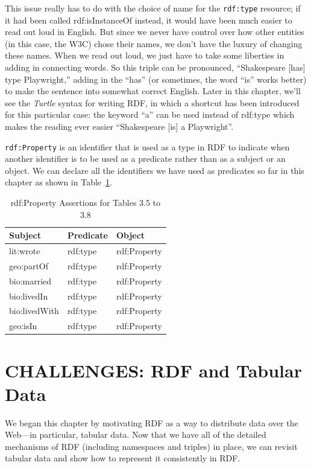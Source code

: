 This issue really has to do with the choice of name for the \texttt{rdf:type}
resource; if it had been called rdf:isInstanceOf instead, it would have
been much easier to read out loud in English. But since we never have
control over how other entities (in this case, the W3C) chose their
names, we don't have the luxury of changing these names. When we read
out loud, we just have to take some liberties in adding in connecting
words. So this triple can be pronounced, ``Shakespeare {[}has{]} type
Playwright,'' adding in the ``has'' (or sometimes, the word ``is'' works
better) to make the sentence into somewhat correct English. Later in
this chapter, we'll see the \emph{Turtle} syntax for writing RDF, in which a
shortcut has been introduced for this particular case: the keyword ``a''
can be used instead of rdf:type which makes the reading ever easier
``Shakespeare {[}is{]} a Playwright''.

\texttt{rdf:Property} is an identifier that is used as a type in RDF to indicate
when another identifier is to be used as a predicate rather than as a
subject or an object. We can declare all the identifiers we have used as
predicates so far in this chapter as shown in Table~\ref{tab:ch3.11}.

\begin{table}[h]
\centering
\begin{tabular}{||l l l ||} 
 \hline
 Subject&Predicate&Object \\ [0.5ex] 
 \hline\hline
lit:wrote&rdf:type&rdf:Property\\
geo:partOf&rdf:type&rdf:Property\\
bio:married&rdf:type&rdf:Property\\
bio:livedIn&rdf:type&rdf:Property\\
bio:livedWith&rdf:type&rdf:Property\\
geo:isIn&rdf:type&rdf:Property\\
\hline
\end{tabular}
\caption{rdf:Property Assertions for Tables 3.5 to 3.8}
\label{tab:ch3.11}
\end{table}

\section{CHALLENGES: RDF and Tabular Data}

We began this chapter by motivating RDF as a way to distribute data over
the Web---in particular, tabular data. Now that we have all of the
detailed mechanisms of RDF (including namespaces and triples) in place,
we can revisit tabular data and show how to represent it consistently in
RDF.

